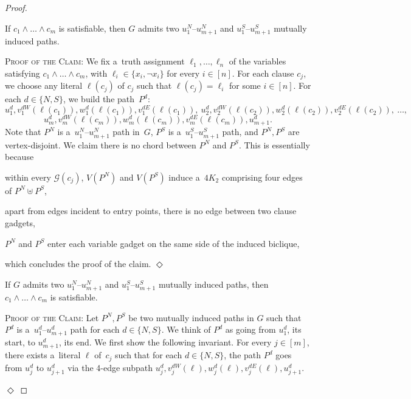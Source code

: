 \documentclass[a4paper,UKenglish,cleveref,autoref]{lipics-v2021}
\newenvironment{proofofclaim}{\noindent \textsc{Proof of the Claim:}}{\unskip\nobreak\hfill$\Diamond$\medskip}
\begin{document}
\begin{proof}
  \begin{claim}
    If $c_1 \land \ldots \land c_m$ is satisfiable, then $G$ admits two $u^N_1$--$u^N_{m+1}$ and $u^S_1$--$u^S_{m+1}$ mutually induced paths.
  \end{claim}
 \begin{proofofclaim}
 We fix a~truth assignment $\ell_1, \ldots, \ell_n$ of the variables satisfying $c_1 \land \ldots \land c_m$, with $\ell_i \in \{x_i, \neg x_i\}$ for every $i \in [n]$.
 For each clause $c_j$, we choose any literal $\ell(c_j)$ of $c_j$ such that $\ell(c_j) = \ell_i$ for some $i \in [n]$. 
 For each $d \in \{N,S\}$, we build the path~$P^d$:
 \[u^d_1, v_1^{dW}(\ell(c_1)), w_1^d(\ell(c_1)), v_1^{dE}(\ell(c_1)),~u^d_2, v_2^{dW}(\ell(c_2)), w_2^d(\ell(c_2)), v_2^{dE}(\ell(c_2)),~\ldots,\]
 \[u^d_m, v_m^{dW}(\ell(c_m)), w_m^d(\ell(c_m)), v_m^{dE}(\ell(c_m)), u^d_{m+1}.\]
 Note that $P^N$ is a~$u^N_1$--$u^N_{m+1}$ path in~$G$, $P^S$ is a~$u^S_1$--$u^S_{m+1}$ path, and $P^N, P^S$ are vertex-disjoint.
 We claim there is no chord between $P^N$ and $P^S$.
 This is essentially because
 \begin{compactitem}
 \item within every $\mathcal G(c_j)$, $V(P^N)$ and $V(P^S)$ induce a~$4K_2$ comprising four edges of $P^N \uplus P^S$,
 \item apart from edges incident to entry points, there is no edge between two clause gadgets,  
 \item $P^N$ and $P^S$ enter each variable gadget on the same side of the induced biclique,
 \end{compactitem}
 which concludes the proof of the claim.
 \end{proofofclaim}

 \begin{claim}\label{clm:paths-to-sat}
   If $G$ admits two $u^N_1$--$u^N_{m+1}$ and $u^S_1$--$u^S_{m+1}$ mutually induced paths, then $c_1 \land \ldots \land c_m$ is satisfiable.
 \end{claim}
 \begin{proofofclaim}
 Let $P^N, P^S$ be two mutually induced paths in $G$ such that $P^d$ is a~$u^d_1$--$u^d_{m+1}$ path for each $d \in \{N,S\}$.
 We think of $P^d$ as going from $u^d_1$, its start, to $u^d_{m+1}$, its end.
 We first show the following invariant.
 For every $j \in [m]$, there exists a~literal $\ell$ of~$c_j$ such that for each $d \in \{N,S\}$, the path $P^d$ goes from $u^d_j$ to $u^d_{j+1}$ via the 4-edge subpath $u^d_j, v_j^{dW}(\ell), w_j^d(\ell), v_j^{dE}(\ell), u^d_{j+1}$.
 

\end{proofofclaim}
\end{proof}
\end{document}
